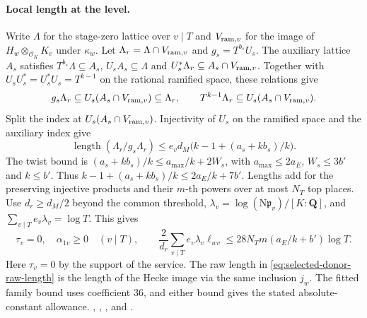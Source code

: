 \paragraph{Local length at the level.}
Write \(\Lambda\) for the stage-zero lattice over \(v\mid T\)
and \(V_{{\rm ram},v}\) for the image of \(H_w\otimes_{\mathcal O_K}K_v\)
under \(\kappa_w\). Let
\(\Lambda_r=\Lambda\cap V_{{\rm ram},v}\) and \(g_s=T^{b_s}U_s\).
The auxiliary lattice \(A_s\) satisfies
\(T^{b_s}\Lambda\subseteq A_s\),
\(U_sA_s\subseteq\Lambda\) and
\(U_s^*\Lambda_r\subseteq A_s\cap V_{{\rm ram},v}\).
Together with \(U_sU_s^*=U_s^*U_s=T^{k-1}\) on the rational
ramified space, these relations give
\[
 g_s\Lambda_r\subseteq U_s(A_s\cap V_{{\rm ram},v})\subseteq\Lambda_r,
 \qquad
 T^{k-1}\Lambda_r\subseteq U_s(A_s\cap V_{{\rm ram},v}).
\]
Split the index at \(U_s(A_s\cap V_{{\rm ram},v})\).
Injectivity of \(U_s\) on the ramified space and the
auxiliary index give
\[
 \operatorname{length}(\Lambda_r/g_s\Lambda_r)
    \le e_v d_M\bigl(k-1+(a_s+kb_s)/k\bigr).
\]
The twist bound is \((a_s+kb_s)/k\le a_{\max}/k+2W_s\),
with \(a_{\max}\le2a_E\), \(W_s\le3b'\) and \(k\le b'\).
Thus \(k-1+(a_s+kb_s)/k\le 2a_E/k+7b'\).
Lengths add for the preserving injective products and their
\(m\)-th powers over at most \(N_T\) top places. Use
\(d_r\ge d_M/2\) beyond the common threshold,
\(\lambda_v=\log(\mathrm N\mathfrak p_v)/[K:\mathbf Q]\), and
\(\sum_{v\mid T}e_v\lambda_v=\log T\). This gives
\begin{equation}
\label{eq:selected-donor-level-index}
 \tau_v=0,\quad \alpha_{1v}\ge0\quad(v\mid T),\qquad
 \frac2{d_r}\sum_{v\mid T} e_v\lambda_v\ell_{wv}
       \le 28N_Tm(a_E/k+b')\log T.
\end{equation}
Here \(\tau_v=0\) by the support of the service. The raw length
in \eqref{eq:selected-donor-raw-length} is the length of the
Hecke image via the same inclusion \(j_w\). The fitted family
bound uses coefficient \(36\), and either bound gives the
stated absolute-constant allowance.
,
,
,
 and
.

